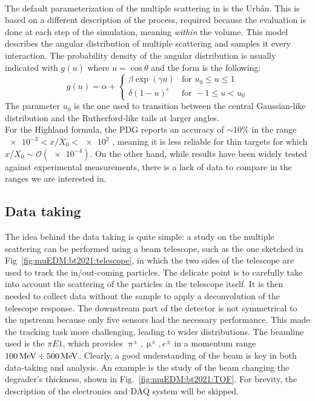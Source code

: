 \begin{refsection}
        \paragraph{\gf}
        The default parameterization of the multiple scattering in \gf is the Urb\'{a}n. 
        This is based on a different description of the process, required because the evaluation is done at each step of the simulation, meaning \textit{within} the volume.
        This model describes the angular distribution of multiple scattering and samples it every interaction.
        The probability density of the angular distribution is usually indicated with $g(u)$ where $u = \cos \theta$ and the form is the following:
        \begin{equation}
            g(u) = \alpha +
            \begin{cases}
                \beta \exp(\gamma u) &\text{for } u_0 \le u \le 1 \\
                \delta (1-u)^\epsilon &\text{for } -1 \le u < u_0
            \end{cases}
        \end{equation}
        The parameter $u_0$ is the one used to transition between the central Gaussian-like distribution and the Rutherford-like tails at larger angles.\\

        \noindent
        For the Highland formula, the PDG reports an accuracy of $\sim 10\%$ in the range $\num{e-3}<x/X_0<\num{e2}$ \cite{PDG}, meaning it is less reliable for thin targets for which $x/X_0 \sim \mathcal{O}(\num{e-4})$.
        On the other hand, while \gf results have been widely tested against experimental measurements, there is a lack of data to compare in the ranges we are interested in.

    \subsection{Data taking}
        The idea behind the data taking is quite simple: a study on the multiple scattering can be performed using a beam telescope, such as the one sketched in Fig~\ref{fig:muEDM:bt2021:telescope}, in which the two sides of the telescope are used to track the in/out-coming particles. 
        The delicate point is to carefully take into account the scattering of the particles in the telescope itself. 
        It is then needed to collect data without the sample to apply a deconvolution of the telescope response.
        The downstream part of the detector is not symmetrical to the upstream because only five sensors had the necessary performance. This made the tracking task more challenging, leading to wider distributions.
        The beamline used is the $\pi E1$, which provides $\uppi^\pm,\upmu^\pm,e^\pm$ in a momentum range $\SI{100}{MeV}\divisionsymbol\SI{500}{MeV}$.
        Clearly, a good understanding of the beam is key in both data-taking and analysis. 
        An example is the study of the beam changing the degrader's thickness, shown in Fig.~\ref{fig:muEDM:bt2021:TOF}.
        For brevity, the description of the electronics and DAQ system will be skipped. 


\end{refsection}
